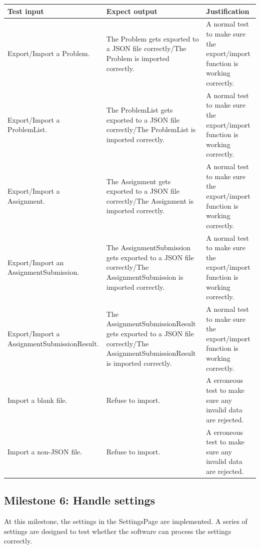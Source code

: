 \documentclass[a4paper]{report}
\begin{document}
\begin{tabulary}{\textwidth}{|L|L|L|}
    \hline
    Test input & Expect output & Justification \\
    \hline
    Export/Import a Problem. & The Problem gets exported to a JSON file correctly/The Problem is imported correctly. & A normal test to make sure the export/import function is working correctly. \\
    \hline
    Export/Import a ProblemList. & The ProblemList gets exported to a JSON file correctly/The ProblemList is imported correctly. & A normal test to make sure the export/import function is working correctly. \\
    \hline
    Export/Import a Assignment. & The Assignment gets exported to a JSON file correctly/The Assignment is imported correctly. & A normal test to make sure the export/import function is working correctly. \\
    \hline
    Export/Import an AssignmentSubmission. & The AssignmentSubmission gets exported to a JSON file correctly/The AssignmentSubmission is imported correctly. & A normal test to make sure the export/import function is working correctly. \\
    \hline
    Export/Import a AssignmentSubmissionResult. & The AssignmentSubmissionResult gets exported to a JSON file correctly/The AssignmentSubmissionResult is imported correctly. & A normal test to make sure the export/import function is working correctly. \\
    \hline
    Import a blank file. & Refuse to import. & A erroneous test to make sure any invalid data are rejected. \\
    \hline
    Import a non-JSON file. & Refuse to import. & A erroneous test to make sure any invalid data are rejected. \\
    \hline
\end{tabulary}

\subsection{Milestone 6: Handle settings}

At this milestone, the settings in the SettingsPage are implemented. A series of settings are designed to test whether the software can process the settings correctly.
\end{document}
